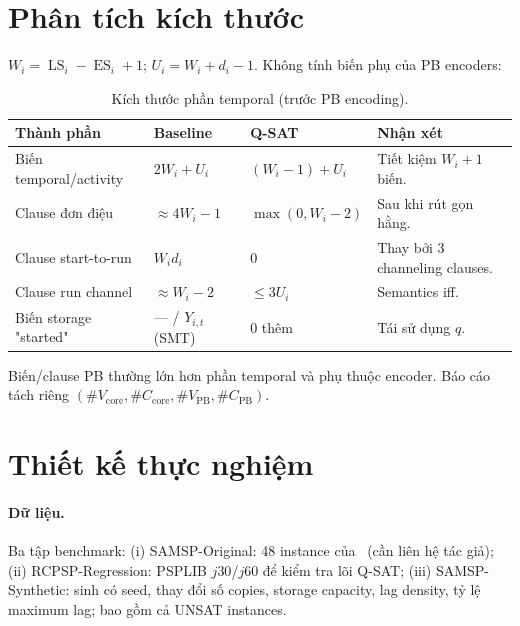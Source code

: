 \documentclass[11pt,a4paper]{article}
\theoremstyle{remark}
\newcommand{\ES}{\operatorname{ES}}
\newcommand{\LS}{\operatorname{LS}}
\begin{document}
\section{Phân tích kích thước}
\label{sec:size}

$W_i = \LS_i - \ES_i + 1$; $U_i = W_i + d_i - 1$.
Không tính biến phụ của PB encoders:

\begin{table}[htbp]
\centering
\caption{Kích thước phần temporal (trước PB encoding).}
\label{tab:size}
\begin{tabularx}{\textwidth}{@{}Y Z Z Y@{}}
\toprule
\textbf{Thành phần} & \textbf{Baseline} & \textbf{Q-SAT} & \textbf{Nhận xét}\\
\midrule
Biến temporal/activity & $2W_i + U_i$ & $(W_i-1) + U_i$ & Tiết kiệm $W_i+1$ biến.\\
Clause đơn điệu & $\approx 4W_i - 1$ & $\max(0, W_i-2)$ & Sau khi rút gọn hằng.\\
Clause start-to-run & $W_i d_i$ & 0 & Thay bởi 3 channeling clauses.\\
Clause run channel & $\approx W_i - 2$ & $\le 3U_i$ & Semantics iff.\\
Biến storage "started" & --- / $Y_{i,t}$ (SMT) & 0 thêm & Tái sử dụng $q$.\\
\bottomrule
\end{tabularx}
\end{table}

Biến/clause PB thường lớn hơn phần temporal và phụ thuộc encoder.
Báo cáo tách riêng $(\#V_\mathrm{core}, \#C_\mathrm{core}, \#V_\mathrm{PB}, \#C_\mathrm{PB})$.

\section{Thiết kế thực nghiệm}
\label{sec:experiment}

\paragraph{Dữ liệu.}
Ba tập benchmark:
(i) SAMSP-Original: 48 instance của~\cite{bofill2022samsp} (cần liên hệ tác giả);
(ii) RCPSP-Regression: PSPLIB $j30$/$j60$ để kiểm tra lõi Q-SAT;
(iii) SAMSP-Synthetic: sinh có seed, thay đổi số copies, storage capacity,
lag density, tỷ lệ maximum lag; bao gồm cả UNSAT instances.
\end{document}
